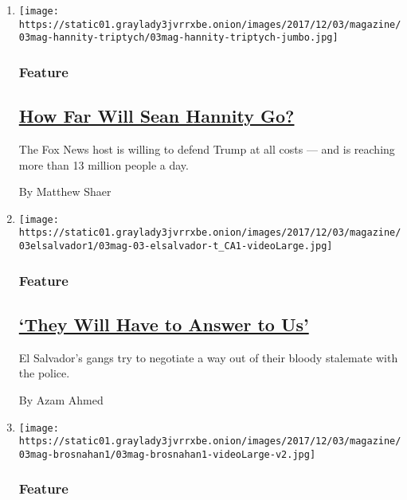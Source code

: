 \begin{enumerate}
\def\labelenumi{\arabic{enumi}.}
\item
  \texttt{[image: https://static01.graylady3jvrrxbe.onion/images/2017/12/03/magazine/03mag-hannity-triptych/03mag-hannity-triptych-jumbo.jpg]}

  \hypertarget{feature}{%
  \subsubsection{Feature}\label{feature}}

  \hypertarget{how-far-will-sean-hannity-go}{%
  \subsection{\texorpdfstring{\href{/2017/11/28/magazine/how-far-will-sean-hannity-go.html}{How
  Far Will Sean Hannity
  Go?}}{How Far Will Sean Hannity Go?}}\label{how-far-will-sean-hannity-go}}

  The Fox News host is willing to defend Trump at all costs --- and is
  reaching more than 13 million people a day.

  By Matthew Shaer
\item
  \texttt{[image: https://static01.graylady3jvrrxbe.onion/images/2017/12/03/magazine/03elsalvador1/03mag-03-elsalvador-t\_CA1-videoLarge.jpg]}

  \hypertarget{feature-1}{%
  \subsubsection{Feature}\label{feature-1}}

  \hypertarget{they-will-have-to-answer-to-us}{%
  \subsection{\texorpdfstring{\href{/2017/11/29/magazine/el-salvador-police-battle-gangs.html}{`They
  Will Have to Answer to
  Us'}}{`They Will Have to Answer to Us'}}\label{they-will-have-to-answer-to-us}}

  El Salvador's gangs try to negotiate a way out of their bloody
  stalemate with the police.

  By Azam Ahmed
\item
  \texttt{[image: https://static01.graylady3jvrrxbe.onion/images/2017/12/03/magazine/03mag-brosnahan1/03mag-brosnahan1-videoLarge-v2.jpg]}

  \hypertarget{feature-2}{%
  \subsubsection{Feature}\label{feature-2}}


\end{enumerate}
